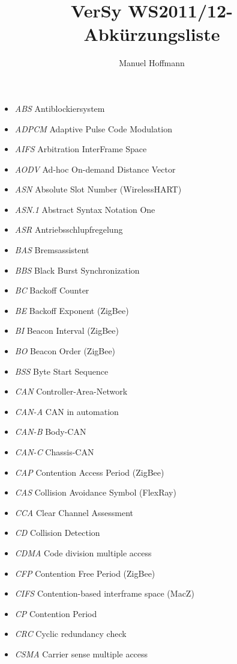 \documentclass{article}
\title{VerSy WS2011/12- Abkürzungsliste}
\author{Manuel Hoffmann}
\begin{document}
\maketitle

\begin{itemize}
	\item \emph{ABS} Antiblockiersystem
	\item \emph{ADPCM} Adaptive Pulse Code Modulation
	\item \emph{AIFS} Arbitration InterFrame Space
	\item \emph{AODV} Ad-hoc On-demand Distance Vector
	\item \emph{ASN} Absolute Slot Number (WirelessHART)
	\item \emph{ASN.1} Abstract Syntax Notation One
	\item \emph{ASR} Antriebsschlupfregelung
	\item \emph{BAS} Bremsassistent
	\item \emph{BBS} Black Burst Synchronization
	\item \emph{BC} Backoff Counter
	\item \emph{BE} Backoff Exponent (ZigBee)
	\item \emph{BI} Beacon Interval (ZigBee)
	\item \emph{BO} Beacon Order (ZigBee)
	\item \emph{BSS} Byte Start Sequence
	\item \emph{CAN} Controller-Area-Network
	\item \emph{CAN-A} CAN in automation
	\item \emph{CAN-B} Body-CAN
	\item \emph{CAN-C} Chassis-CAN
	\item \emph{CAP} Contention Access Period (ZigBee)
	\item \emph{CAS} Collision Avoidance Symbol (FlexRay)
	\item \emph{CCA} Clear Channel Assessment
	\item \emph{CD} Collision Detection
	\item \emph{CDMA} Code division multiple access
	\item \emph{CFP} Contention Free Period (ZigBee)
	\item \emph{CIFS} Contention-based interframe space (MacZ)
	\item \emph{CP} Contention Period
	\item \emph{CRC} Cyclic redundancy check
	\item \emph{CSMA} Carrier sense multiple access

\end{itemize}
\end{document}
